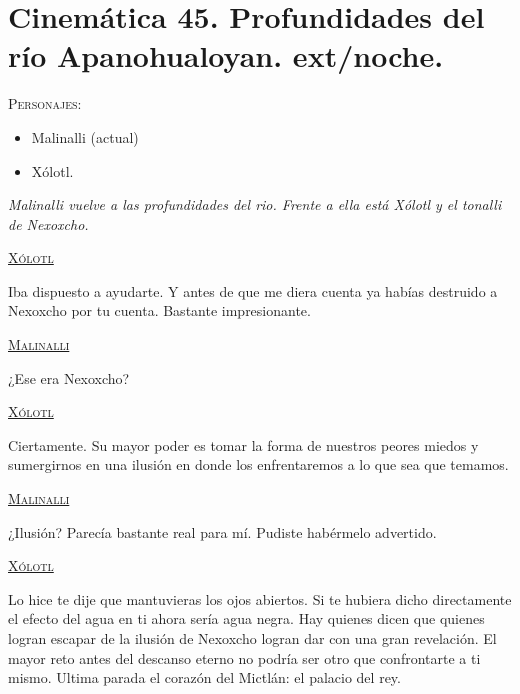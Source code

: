 \documentclass[11pt,letterpaper]{article}
\begin{document}
\section{Cinemática 45. Profundidades del río Apanohualoyan. ext/noche. }
 \textsc{Personajes}:
 \begin{itemize}
 \item Malinalli (actual)
\item Xólotl.

 \end{itemize}
\textit{Malinalli vuelve a las profundidades del rio. Frente a ella está Xólotl y el tonalli de Nexoxcho.}
\begin{center}
\textsc{\underline{Xólotl}}
\\
\par
Iba dispuesto a ayudarte.  Y antes de que me diera cuenta ya habías destruido a Nexoxcho por tu cuenta. Bastante impresionante.
\\
\par
\textsc{\underline{Malinalli}}
\\
\par
¿Ese era Nexoxcho?
\\
\par
\textsc{\underline{Xólotl}}
\\
\par
Ciertamente. Su mayor poder es tomar la forma de nuestros peores miedos y sumergirnos en una ilusión en donde los enfrentaremos a lo que sea que temamos.
\\
\par
\textsc{\underline{Malinalli}}
\\
\par
¿Ilusión? Parecía bastante real para mí. Pudiste habérmelo advertido.
\\
\par
\textsc{\underline{Xólotl}}
\\
\par
Lo hice te dije que mantuvieras los ojos abiertos. Si te hubiera dicho directamente el efecto del agua en ti ahora sería agua negra. Hay quienes dicen que quienes logran escapar de la ilusión de Nexoxcho logran dar con una gran revelación. El mayor reto antes del descanso eterno no podría ser otro que confrontarte a ti mismo. Ultima parada el corazón del Mictlán: el palacio del rey.  
\end{center}
\end{document}
